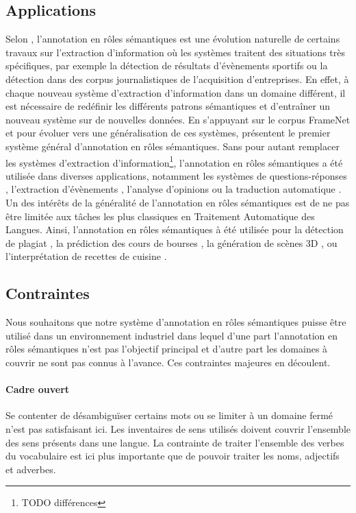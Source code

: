 \subsection{Applications}

Selon \cite{gildea2002automatic}, l'annotation en rôles sémantiques est une
évolution naturelle de certains travaux sur l'extraction d'information où les
systèmes traitent des situations très spécifiques, par exemple la détection de
résultats d'évènements sportifs ou la détection dans des corpus journalistiques
de l'acquisition d'entreprises. En effet, à chaque nouveau système d'extraction
d'information dans un domaine différent, il est nécessaire de redéfinir les
différents patrons sémantiques et d'entraîner un nouveau système sur de
nouvelles données. En s'appuyant sur le corpus FrameNet et pour évoluer vers
une généralisation de ces systèmes, \cite{gildea2002automatic} présentent le
premier système général d'annotation en rôles sémantiques. Sans pour autant
remplacer les systèmes d'extraction d'information\footnote{TODO différences},
l'annotation en rôles sémantiques a été utilisée dans diverses applications,
notamment les systèmes de questions-réponses \citep{shen2007using},
l'extraction d'évènements \citep{exner2011using},  l'analyse d'opinions
\citep{das2012structure} ou la traduction automatique
\citep{bazrafshan2013semantic}. Un des intérêts de la généralité de
l'annotation en rôles sémantiques est de ne pas être limitée aux tâches les
plus classiques en Traitement Automatique des Langues. Ainsi, l'annotation en
rôles sémantiques à été utilisée pour la détection de plagiat
\citep{osman2012improved}, la prédiction des cours de bourses
\citep{xie2013semantic}, la génération de scènes 3D \citep{chang2014semantic},
ou l'interprétation de recettes de cuisine \citep{malmaud2014cooking}.

\subsection{Contraintes}

Nous souhaitons que notre système d'annotation en rôles sémantiques puisse être
utilisé dans un environnement industriel dans lequel d'une part l'annotation en
rôles sémantiques n'est pas l'objectif principal et d'autre part les domaines à
couvrir ne sont pas connus à l'avance. Ces contraintes majeures en découlent.

\paragraph{Cadre ouvert} Se contenter de désambiguïser certains mots ou se
limiter à un domaine fermé n'est pas satisfaisant ici. Les inventaires de sens
utilisés doivent couvrir l'ensemble des sens présents dans une langue. La
contrainte de traiter l'ensemble des verbes du vocabulaire est ici plus
importante que de pouvoir traiter les noms, adjectifs et adverbes.

